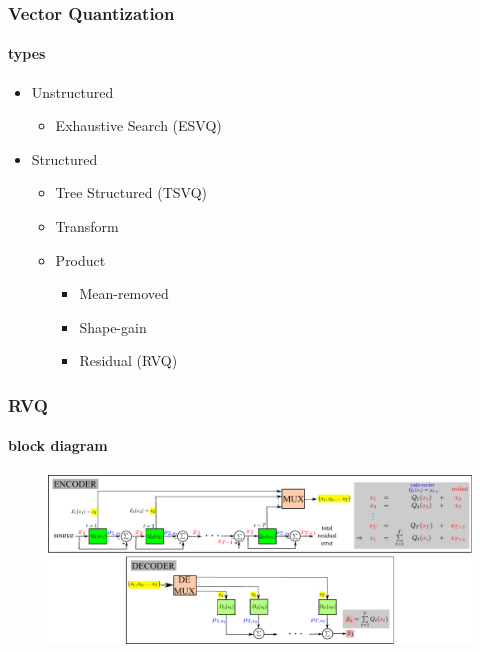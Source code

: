 \begin{frame}
\frametitle{Vector Quantization}
\framesubtitle{types}
\logoCSIPCPL\mypagenum
	\begin{itemize}
		\item Unstructured
			\begin{itemize}
				\item Exhaustive Search (ESVQ)
			\end{itemize}
		\item Structured
		\begin{itemize}
			\item Tree Structured (TSVQ)
			\item Transform
			\item Product
				\begin{itemize}
					\item Mean-removed
					\item Shape-gain
					\item Residual (RVQ)
				\end{itemize}
		\end{itemize}
	\end{itemize}
\end{frame}




\begin{frame}[plain]
\frametitle{RVQ}
\framesubtitle{block diagram}
\logoCSIPCPL\mypagenum
	\begin{changemargin}{-1.3in}{0in}
		\begin{figure}				
			\includegraphics[width=1.3\textwidth]{thesis/RVQ_blockDiagram.pdf}
		\end{figure}
	\end{changemargin}
\end{frame}





